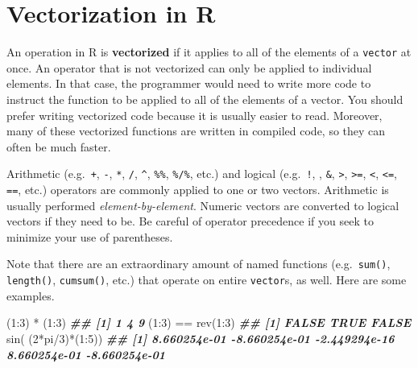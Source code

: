 \documentclass[
  12pt,
  krantz2]{krantz}
\makeatletter
\newenvironment{Shaded}{\begin{snugshade}}{\end{snugshade}}
\newcommand{\DecValTok}[1]{\textcolor[rgb]{0.06,0.06,0.06}{#1}}
\newcommand{\DocumentationTok}[1]{\textcolor[rgb]{0.37,0.37,0.37}{\textbf{\textit{#1}}}}
\newcommand{\FunctionTok}[1]{\textcolor[rgb]{0,0,0}{#1}}
\newcommand{\NormalTok}[1]{#1}
\newcommand{\SpecialCharTok}[1]{\textcolor[rgb]{0,0,0}{#1}}
\newenvironment{kframe}{%
\medskip{}
\setlength{\fboxsep}{.8em}
 \def\at@end@of@kframe{}%
 \ifinner\ifhmode%
  \def\at@end@of@kframe{\end{minipage}}%
  \begin{minipage}{\columnwidth}%
 \fi\fi%
 \def\FrameCommand##1{\hskip\@totalleftmargin \hskip-\fboxsep
 \colorbox{shadecolor}{##1}\hskip-\fboxsep
     \hskip-\linewidth \hskip-\@totalleftmargin \hskip\columnwidth}%
 \MakeFramed {\advance\hsize-\width
   \@totalleftmargin\z@ \linewidth\hsize
   \@setminipage}}%
 {\par\unskip\endMakeFramed%
 \at@end@of@kframe}
\renewenvironment{Shaded}{\begin{kframe}}{\end{kframe}}
\makeatother
\begin{document}
\hypertarget{vectorization-in-r}{%
\section{Vectorization in R}\label{vectorization-in-r}}

An operation in R is \textbf{vectorized} if it applies to all of the elements of a \texttt{vector} at once. An operator that is not vectorized can only be applied to individual elements. In that case, the programmer would need to write more code to instruct the function to be applied to all of the elements of a vector. You should prefer writing vectorized code because it is usually easier to read. Moreover, many of these vectorized functions are written in compiled code, so they can often be much faster.

Arithmetic (e.g.~\texttt{+}, \texttt{-}, \texttt{*}, \texttt{/}, \texttt{\^{}}, \texttt{\%\%}, \texttt{\%/\%}, etc.) and logical (e.g.~\texttt{!}, \texttt{\textbar{}}, \texttt{\&}, \texttt{\textgreater{}}, \texttt{\textgreater{}=}, \texttt{\textless{}}, \texttt{\textless{}=}, \texttt{==}, etc.) operators are commonly applied to one or two vectors. Arithmetic is usually performed \emph{element-by-element}. Numeric vectors are converted to logical vectors if they need to be. Be careful of operator precedence if you seek to minimize your use of parentheses.

Note that there are an extraordinary amount of named functions (e.g.~\texttt{sum()}, \texttt{length()}, \texttt{cumsum()}, etc.) that operate on entire \texttt{vector}s, as well. Here are some examples.

\begin{Shaded}
\begin{Highlighting}[]
\NormalTok{(}\DecValTok{1}\SpecialCharTok{:}\DecValTok{3}\NormalTok{) }\SpecialCharTok{*}\NormalTok{ (}\DecValTok{1}\SpecialCharTok{:}\DecValTok{3}\NormalTok{)        }
\DocumentationTok{\#\# [1] 1 4 9}
\NormalTok{(}\DecValTok{1}\SpecialCharTok{:}\DecValTok{3}\NormalTok{) }\SpecialCharTok{==} \FunctionTok{rev}\NormalTok{(}\DecValTok{1}\SpecialCharTok{:}\DecValTok{3}\NormalTok{)    }
\DocumentationTok{\#\# [1] FALSE  TRUE FALSE}
\FunctionTok{sin}\NormalTok{( (}\DecValTok{2}\SpecialCharTok{*}\NormalTok{pi}\SpecialCharTok{/}\DecValTok{3}\NormalTok{)}\SpecialCharTok{*}\NormalTok{(}\DecValTok{1}\SpecialCharTok{:}\DecValTok{5}\NormalTok{)) }
\DocumentationTok{\#\# [1]  8.660254e{-}01 {-}8.660254e{-}01 {-}2.449294e{-}16  8.660254e{-}01 {-}8.660254e{-}01}
\end{Highlighting}
\end{Shaded}
\end{document}
